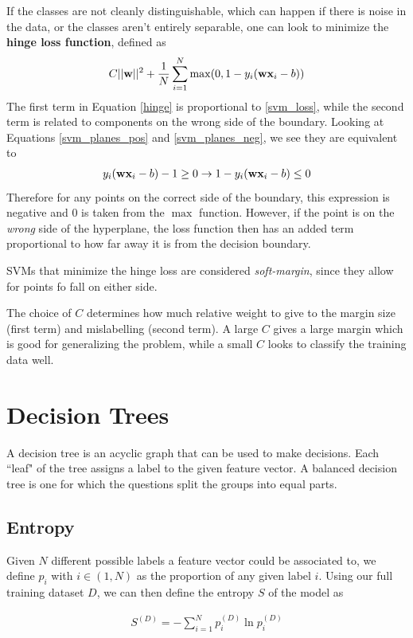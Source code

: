 If the classes are not cleanly distinguishable, which can happen if there is noise in the data, or the classes aren't entirely separable, one can look to minimize the \textbf{hinge loss function}, defined as
\begin{align}\label{hinge}
	C||\textbf{w}||^2 + \frac{1}{N}\sum_{i=1}^N \max(0,1-y_i(\textbf{wx}_i-b))
\end{align}
The first term in Equation \ref{hinge} is proportional to \ref{svm_loss}, while the second term is related to components on the wrong side of the boundary. Looking at Equations \ref{svm_planes_pos} and \ref{svm_planes_neg}, we see they are equivalent to 
\begin{align}
	y_i(\textbf{wx}_i-b) -1\ge 0\rightarrow 1- y_i(\textbf{wx}_i-b) \le 0
\end{align}
Therefore for any points on the correct side of the boundary, this expression is negative and $0$ is taken from the $\max$ function. However, if the point is on the \emph{wrong} side of the hyperplane, the loss function then has an added term proportional to how far away it is from the decision boundary.

SVMs that minimize the hinge loss are considered \emph{soft-margin}, since they allow for points fo fall on either side.

The choice of $C$ determines how much relative weight to give to the margin size (first term) and mislabelling (second term). A large $C$ gives a large margin which is good for generalizing the problem, while a small $C$  looks to classify the training data well.

\section{Decision Trees}
A decision tree is an acyclic graph that can be used to make decisions. Each ``leaf" of the tree assigns a label to the given feature vector. A balanced decision tree is one for which the questions split the groups into equal parts.

\subsection{Entropy}
Given $N$ different possible labels a feature vector could be associated to, we define $p_i$ with $i\in (1,N)$ as the proportion of any given label $i$. Using our full training dataset $D$, we can then define the entropy $S$ of the model as 

\begin{align}
	S^{(D)} = -\sum_{i=1}^N p^{(D)}_i\ln p^{(D)}_i
\end{align}

